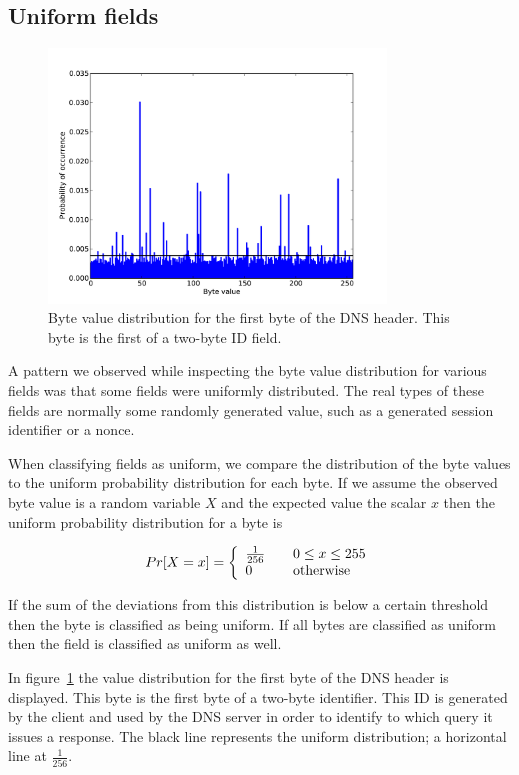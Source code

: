 \documentclass[a4paper]{report}
\begin{document}
\subsection{Uniform fields}
\begin{figure}[h]
    \centering
    \includegraphics[width=0.8\textwidth]{uniform}
    \captionsetup{width=0.8\textwidth}
    \caption{Byte value distribution for the first byte of the DNS header.
        This byte is the first of a two-byte ID field.}
    \label{fig:uniform}
\end{figure}

A pattern we observed while inspecting the byte value distribution for
various fields was that some fields were uniformly distributed. The real
types of these fields are normally some randomly generated value, such as
a generated session identifier or a nonce.

When classifying fields as uniform, we compare the distribution of the byte
values to the uniform probability distribution for each byte. If we assume the
observed byte value is a random variable $X$ and the expected value the scalar
$x$ then the uniform probability distribution for a byte is

\[
    Pr[X = x] = \left\{
        \begin{array}{l l}
            \frac{1}{256} & \quad 0 \le x \le 255 \\
            0 & \quad \text{otherwise}
        \end{array}
    \right.
\]

If the sum of the deviations from this distribution is below a certain
threshold then the byte is classified as being uniform. If all bytes are
classified as uniform then the field is classified as uniform as well.

In figure~\ref{fig:uniform} the value distribution for the first byte of the
DNS header is displayed. This byte is the first byte of a two-byte identifier.
This ID is generated by the client and used by the DNS server in order to
identify to which query it issues a response. The black line represents the
uniform distribution; a horizontal line at $\frac{1}{256}$.
\end{document}
